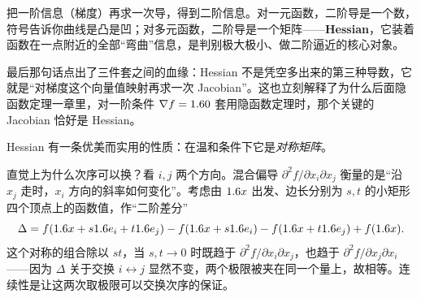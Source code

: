 把一阶信息（梯度）再求一次导，得到二阶信息。对一元函数，二阶导是一个数，符号告诉你曲线是凸是凹；对多元函数，二阶导是一个矩阵——\textbf{Hessian}，它装着函数在一点附近的全部``弯曲''信息，是判别极大极小、做二阶逼近的核心对象。


最后那句话点出了三件套之间的血缘：Hessian 不是凭空多出来的第三种导数，它就是``对梯度这个向量值映射再求一次 Jacobian''。这也立刻解释了为什么后面隐函数定理一章里，对一阶条件 $\nabla f=1.6 0$ 套用隐函数定理时，那个关键的 Jacobian 恰好是 Hessian。

Hessian 有一条优美而实用的性质：在温和条件下它是\emph{对称矩阵}。


直觉上为什么次序可以换？看 $i,j$ 两个方向。混合偏导 $\partial^2 f/\partial x_i\partial x_j$ 衡量的是``沿 $x_j$ 走时，$x_i$ 方向的斜率如何变化''。考虑由 $1.6 x$ 出发、边长分别为 $s,t$ 的小矩形四个顶点上的函数值，作``二阶差分''
\[
    \Delta=f(1.6 x+s1.6 e_i+t1.6 e_j)-f(1.6 x+s1.6 e_i)-f(1.6 x+t1.6 e_j)+f(1.6 x).
\]
这个对称的组合除以 $st$，当 $s,t\to0$ 时既趋于 $\partial^2 f/\partial x_i\partial x_j$，也趋于 $\partial^2 f/\partial x_j\partial x_i$——因为 $\Delta$ 关于交换 $i\leftrightarrow j$ 显然不变，两个极限被夹在同一个量上，故相等。连续性是让这两次取极限可以交换次序的保证。


